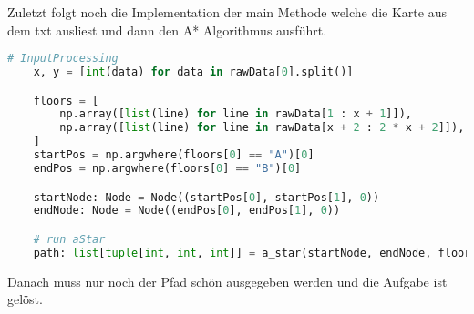 \documentclass[a4paper,10pt,ngerman]{scrartcl}
\begin{document}
Zuletzt folgt noch die Implementation der main Methode welche die Karte aus dem txt ausliest und dann den A* Algorithmus ausführt.
\begin{lstlisting}[language=Python]
# InputProcessing
    x, y = [int(data) for data in rawData[0].split()]

    floors = [
        np.array([list(line) for line in rawData[1 : x + 1]]),
        np.array([list(line) for line in rawData[x + 2 : 2 * x + 2]]),
    ]
    startPos = np.argwhere(floors[0] == "A")[0]
    endPos = np.argwhere(floors[0] == "B")[0]

    startNode: Node = Node((startPos[0], startPos[1], 0))
    endNode: Node = Node((endPos[0], endPos[1], 0))

    # run aStar
    path: list[tuple[int, int, int]] = a_star(startNode, endNode, floors)
\end{lstlisting}
Danach muss nur noch der Pfad schön ausgegeben werden und die Aufgabe ist gelöst.
\end{document}
